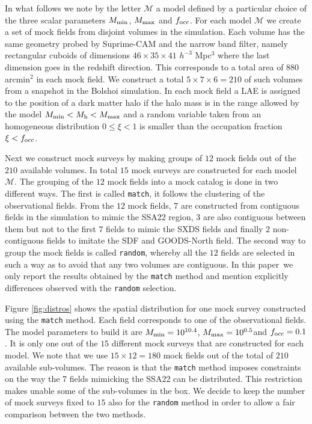 \documentclass[usenatbib]{mn2e}
\newcommand{\documentname}{paper~}
\newcommand{\hMsun}{{\ifmmode{h^{-1}{\rm
        {M_{\odot}}}}\else{$h^{-1}{\rm{M_{\odot}}}$}\fi}}
\begin{document}
{In what follows we note by the letter ${\mathcal M}$ a model
defined by a particular choice of the three scalar parameters $M_{\rm
  min}$, $M_{\rm  max}$ and $f_{\rm occ}$. For each model ${\mathcal
  M}$ we create a set of mock fields from disjoint volumes in the
simulation. Each volume has the same geometry probed by Suprime-CAM
and the narrow band filter, namely rectangular cuboids of dimensions
$46\times 35\times 41$ $h^{-3}$ Mpc$^{3}$ where the last dimension goes
in the redshift direction. This corresponds to a total area of $880$
arcmin$^{2}$ in each mock field. We construct a total $5\times 7
\times 6=210$ of such volumes from a snapshot in the Bolshoi
simulation. In each mock field a LAE is assigned to the position of a
dark matter halo if the halo mass is in the range allowed by the model
$M_{\rm min}<M_{\rm h}<M_{\rm max}$ and a random variable taken from
an homogeneous distribution $0\leq \xi<1$ is smaller than the occupation
fraction $\xi<f_{\rm occ}$.

Next we construct mock surveys by making groups of $12$ mock fields
out of the $210$ available volumes. In total $15$ mock surveys are
constructed for each model $\mathcal{M}$. The grouping of the $12$
mock fields into a mock catalog is done in two different ways. The
first is called {\texttt{match}}, it follows the clustering of the
observational fields. From the $12$ mock fields, $7$ are constructed
from contiguous fields in the simulation to mimic the SSA22 region,
$3$ are also contiguous between them but not to the first $7$ fields
to mimic the SXDS fields and finally $2$ non-contiguous fields to
imitate the SDF and GOODS-North field.   The second way to group the
mock fields is called {\texttt{random}}, whereby all the $12$ fields
are selected in such a way as to avoid that any two volumes are
contiguous. In this \documentname we only report the results obtained
by the {\texttt{match}} method and mention explicitly differences
observed with the {\texttt{random}} selection. 


Figure \ref{fig:distros} shows the spatial distribution for one mock
survey constructed using the {\texttt{match}} method. Each field
corresponds to one of the observational fields. The model parameters
to build it are $M_{\rm min}=10^{10.4}$\hMsun, $M_{\rm
  max}=10^{0.5}$\hMsun and $f_{\rm occ}=0.1$. It is only one out of
the $15$ different mock surveys that are constructed for each
model. We note that we use $15\times 12=180$ mock fields out of the
total of $210$ available sub-volumes. The reason is that the {\texttt{match}}
method imposes constraints on the way the $7$ fields mimicking the
SSA22 can be distributed. This restriction makes unable some of the
sub-volumes in the box. We decide to keep the number of mock surveys
fixed to $15$ also for the {\texttt{random}} method in order to allow a
fair comparison between the two methods.




}
\end{document}
